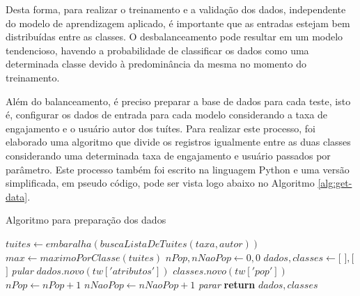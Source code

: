 \documentclass[oneside,openright,12pt]{ufsm_2015} %
\begin{document}
    \par Desta forma, para realizar o treinamento e a validação dos dados, independente do modelo de aprendizagem aplicado, é importante que as entradas estejam bem distribuídas entre as classes. O desbalanceamento pode resultar em um modelo tendencioso, havendo a probabilidade de classificar os dados como uma determinada classe devido à predominância da mesma no momento do treinamento.

    \par Além do balanceamento, é preciso preparar a base de dados para cada teste, isto é, configurar os dados de entrada para cada modelo considerando a taxa de engajamento e o usuário autor dos tuítes. Para realizar este processo, foi elaborado uma algoritmo que divide os registros igualmente entre as duas classes considerando uma determinada taxa de engajamento e usuário passados por parâmetro. Este processo também foi escrito na linguagem Python e uma versão simplificada, em pseudo código, pode ser vista logo abaixo no Algoritmo \ref{alg:get-data}.
    
    \begin{algorithm}[ht]
    \caption{Algoritmo para preparação dos dados}
    \label{alg:get-data}
    \begin{algorithmic}[1]
        \State $tuites \gets embaralha(buscaListaDeTuites(taxa, autor))$
        \State 
        \State $max \gets maximoPorClasse(tuites)$
        \State $nPop, nNaoPop \gets 0, 0$
        \State $dados, classes \gets [$ $], [$ $]$
        \State
                \State \textit{pular}
            \EndIf
            \State $dados.novo(tw['atributos'])$
            \State $classes.novo(tw['pop'])$
                \State $nPop \gets nPop + 1$
            \Else
                \State $nNaoPop \gets nNaoPop + 1$
            \EndIf
                \State \textit{parar}
            \EndIf
        \EndFor
        \State \textbf{return} $dados, classes$
        \EndFunction
    \end{algorithmic}
    \end{algorithm}
    
\end{document}
